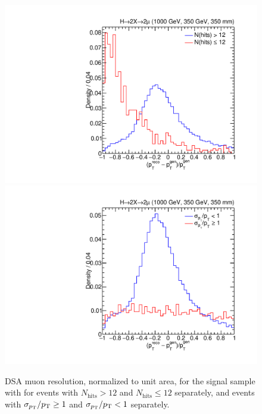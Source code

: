 \begin{figure}[htpb]
  \centering
  \includegraphics[width=\DSquareWidth]{figures/displaced/QCUTRES_Sig_pTRes_hits_1000_350_350.pdf}
  \hspace*{-2em}
  \includegraphics[width=\DSquareWidth]{figures/displaced/QCUTRES_Sig_pTRes_fpte_1000_350_350.pdf}
  \caption[DSA muon \pT resolution with and without selections on $N_\text{hits}$ and $\pTErr/\pT$.]{DSA muon \pT resolution, normalized to unit area, for the \twoMu signal sample with  for  events with $N_\text{hits} > 12$ and $N_\text{hits} \leq 12$ separately, and  events with $\sigma_{p_{\mathrm{T}}}/p_{\mathrm{T}} \geq 1$ and $\sigma_{p_{\mathrm{T}}}/p_{\mathrm{T}} < 1$ separately.}
  \label{fig:dd:QCUT_PTRES}
\end{figure}
